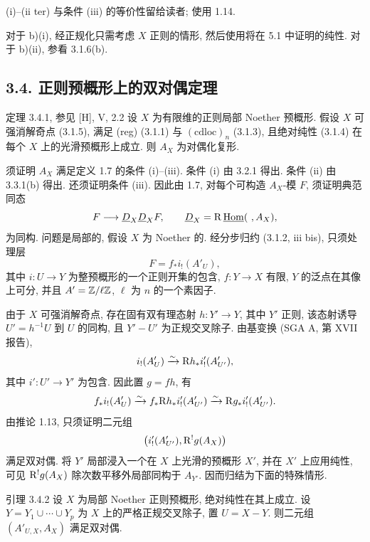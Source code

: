 \begin{prooftext}
(i)--(ii ter) 与条件 (iii) 的等价性留给读者; 使用 1.14.

对于 b)(i), 经正规化只需考虑 $X$ 正则的情形, 然后使用将在 5.1 中证明的纯性. 对于 b)(ii), 参看 3.1.6(b). \qedtext
\end{prooftext}

\subsection*{3.4. 正则预概形上的双对偶定理}

\begin{statement}{定理 3.4.1, 参见 [H], V, 2.2}
设 $X$ 为有限维的正则局部 Noether 预概形. 假设 $X$ 可强消解奇点 (3.1.5), 满足 (reg) (3.1.1) 与 $(\mathrm{cdloc})_n$ (3.1.3), 且绝对纯性 (3.1.4) 在每个 $X$ 上的光滑预概形上成立. 则 $A_X$ 为对偶化复形.
\end{statement}

\begin{prooftext}
须证明 $A_X$ 满足定义 1.7 的条件 (i)--(iii). 条件 (i) 由 3.2.1 得出. 条件 (ii) 由 3.3.1(b) 得出. 还须证明条件 (iii). 因此由 1.7, 对每个可构造 $A_X$-模 $F$, 须证明典范同态
\[
   F\longrightarrow \underline D_X\underline D_XF,
   \qquad \underline D_X=\mathrm R\,\underline{\operatorname{Hom}}(\ ,A_X),
\]
为同构. 问题是局部的, 假设 $X$ 为 Noether 的. 经分步归约 (3.1.2, iii bis), 只须处理层
\[
   F=f_*i_!(A'_U),
\]
其中 $i:U\to Y$ 为整预概形的一个正则开集的包含, $f:Y\to X$ 有限, $Y$ 的泛点在其像上可分, 并且 $A'=\mathbb{Z}/\ell\mathbb{Z}$, $\ell$ 为 $n$ 的一个素因子.

由于 $X$ 可强消解奇点, 存在固有双有理态射 $h:Y'\to Y$, 其中 $Y'$ 正则, 该态射诱导 $U'=h^{-1}U$ 到 $U$ 的同构, 且 $Y'-U'$ 为正规交叉除子. 由基变换 (SGA A, 第 XVII 报告),
\[
   i_!(A'_U)\xrightarrow{\sim}\mathrm R h_*i'_!(A'_{U'}),
\]
其中 $i':U'\to Y'$ 为包含. 因此置 $g=fh$, 有
\[
   f_*i_!(A'_U)
     \xrightarrow{\sim} f_*\mathrm R h_*i'_!(A'_{U'})
     \xrightarrow{\sim} \mathrm R g_*i'_!(A'_{U'}).
\]
由推论 1.13, 只须证明二元组
\[
   \bigl(i'_!(A'_{U'}),\mathrm R^!g(A_X)\bigr)
\]
满足双对偶. 将 $Y'$ 局部浸入一个在 $X$ 上光滑的预概形 $X'$, 并在 $X'$ 上应用纯性, 可见 $\mathrm R^!g(A_X)$ 除次数平移外局部同构于 $A_{Y'}$. 因而归结为下面的特殊情形.
\end{prooftext}

\begin{statement}{引理 3.4.2}
设 $X$ 为局部 Noether 正则预概形, 绝对纯性在其上成立. 设 $Y=Y_1\cup\cdots\cup Y_p$ 为 $X$ 上的严格正规交叉除子, 置 $U=X-Y$. 则二元组 $(A'_{U,X},A_X)$ 满足双对偶.
\end{statement}

